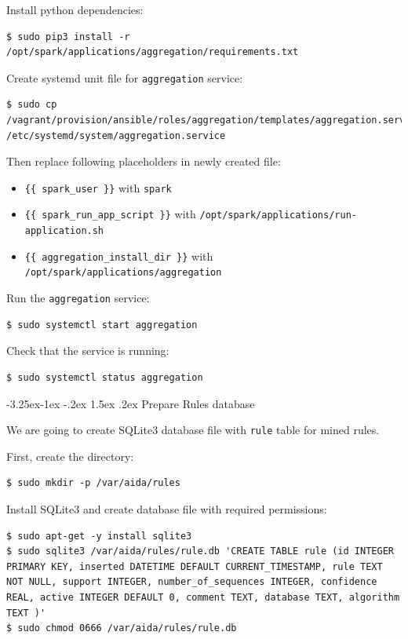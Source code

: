 \documentclass[a4paper]{article} %
\makeatletter
\renewcommand{\normalsize}{\fontsize{12}{15}\selectfont\color{textcolor}}
\renewcommand\subsubsection{\@startsection{subsubsection}{3}{\z@}%
                   {-3.25ex\@plus -1ex \@minus -.2ex}%
                   {1.5ex \@plus .2ex}%
                   {\normalfont\sffamily\normalsize\bfseries\color{projectcolor}}}
\makeatother
\begin{document}
Install python dependencies:
\begin{lstlisting}
$ sudo pip3 install -r /opt/spark/applications/aggregation/requirements.txt
\end{lstlisting}

Create systemd unit file for \texttt{aggregation} service:
\begin{lstlisting}
$ sudo cp /vagrant/provision/ansible/roles/aggregation/templates/aggregation.service.j2 /etc/systemd/system/aggregation.service
\end{lstlisting}

Then replace following placeholders in newly created file:
\begin{itemize}[noitemsep,nolistsep]
\item \texttt{\{\{ spark\_user \}\}} with \texttt{spark}
\item \texttt{\{\{ spark\_run\_app\_script \}\}} with \texttt{/opt/spark/applications/run-application.sh}
\item \texttt{\{\{ aggregation\_install\_dir \}\}} with \texttt{/opt/spark/applications/aggregation}
\end{itemize}

Run the \texttt{aggregation} service:
\begin{lstlisting}
$ sudo systemctl start aggregation
\end{lstlisting}

Check that the service is running:
\begin{lstlisting}
$ sudo systemctl status aggregation
\end{lstlisting}


\subsubsection{Prepare Rules database}

We are going to create SQLite3 database file with \texttt{rule} table for mined rules.

First, create the directory:
\begin{lstlisting}
$ sudo mkdir -p /var/aida/rules
\end{lstlisting}

Install SQLite3 and create database file with required permissions:
\begin{lstlisting}
$ sudo apt-get -y install sqlite3
$ sudo sqlite3 /var/aida/rules/rule.db 'CREATE TABLE rule (id INTEGER PRIMARY KEY, inserted DATETIME DEFAULT CURRENT_TIMESTAMP, rule TEXT NOT NULL, support INTEGER, number_of_sequences INTEGER, confidence REAL, active INTEGER DEFAULT 0, comment TEXT, database TEXT, algorithm TEXT )'
$ sudo chmod 0666 /var/aida/rules/rule.db
\end{lstlisting}
\end{document}

